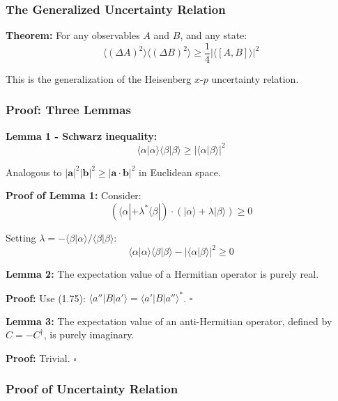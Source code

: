 \documentclass[11pt,a4paper]{article}
\begin{document}
\subsubsection{The Generalized Uncertainty Relation}

\textbf{Theorem:} For any observables $A$ and $B$, and any state:
\begin{equation}
\boxed{\langle(\Delta A)^2\rangle\langle(\Delta B)^2\rangle \geq \frac{1}{4}|\langle[A,B]\rangle|^2}
\tag{1.146}
\end{equation}

This is the generalization of the Heisenberg $x$-$p$ uncertainty relation.

\subsubsection{Proof: Three Lemmas}

\textbf{Lemma 1 - Schwarz inequality:}
\begin{equation}
\langle\alpha|\alpha\rangle\langle\beta|\beta\rangle \geq |\langle\alpha|\beta\rangle|^2
\tag{1.147}
\end{equation}

Analogous to $|\mathbf{a}|^2|\mathbf{b}|^2 \geq |\mathbf{a} \cdot \mathbf{b}|^2$ in Euclidean space.

\textbf{Proof of Lemma 1:}
Consider:
\begin{equation}
(\langle\alpha| + \lambda^*\langle\beta|) \cdot (|\alpha\rangle + \lambda|\beta\rangle) \geq 0
\tag{1.149}
\end{equation}

Setting $\lambda = -\langle\beta|\alpha\rangle/\langle\beta|\beta\rangle$:
\begin{equation}
\langle\alpha|\alpha\rangle\langle\beta|\beta\rangle - |\langle\alpha|\beta\rangle|^2 \geq 0
\tag{1.150}
\end{equation}

\textbf{Lemma 2:} The expectation value of a Hermitian operator is purely real.

\textbf{Proof:} Use (1.75): $\langle a''|B|a'\rangle = \langle a'|B|a''\rangle^*$. $\square$

\textbf{Lemma 3:} The expectation value of an anti-Hermitian operator, defined by $C = -C^\dagger$, is purely imaginary.

\textbf{Proof:} Trivial. $\square$

\subsubsection{Proof of Uncertainty Relation}
\end{document}
